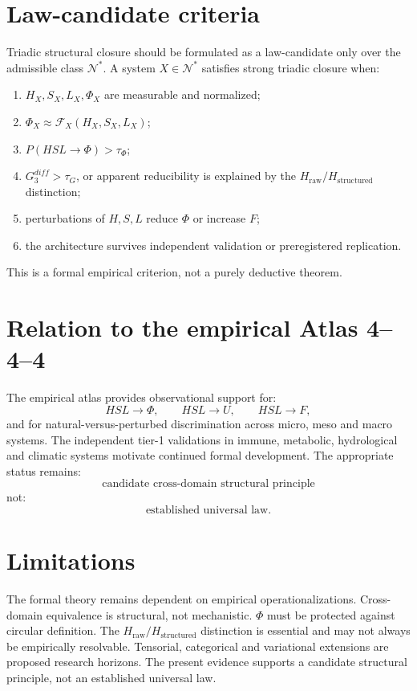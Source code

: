 \documentclass[11pt,a4paper]{article}
\newcommand{\Hraw}{H_{\mathrm{raw}}}
\newcommand{\Hstr}{H_{\mathrm{structured}}}
\newcommand{\Nstar}{\mathcal{N}^{*}}
\begin{document}
\section{Law-candidate criteria}

Triadic structural closure should be formulated as a law-candidate only over the admissible class $\Nstar$.
A system $X\in\Nstar$ satisfies strong triadic closure when:
\begin{enumerate}
\item $H_X,S_X,L_X,\Phi_X$ are measurable and normalized;
\item $\Phi_X\approx\mathcal{F}_X(H_X,S_X,L_X)$;
\item $P(HSL\rightarrow\Phi)>\tau_\Phi$;
\item $G_3^{diff}>\tau_G$, or apparent reducibility is explained by the $\Hraw/\Hstr$ distinction;
\item perturbations of $H,S,L$ reduce $\Phi$ or increase $F$;
\item the architecture survives independent validation or preregistered replication.
\end{enumerate}
This is a formal empirical criterion, not a purely deductive theorem.

\section{Relation to the empirical Atlas 4--4--4}

The empirical atlas provides observational support for:
\[
HSL\rightarrow\Phi,\qquad HSL\rightarrow U,\qquad HSL\rightarrow F,
\]
and for natural-versus-perturbed discrimination across micro, meso and macro systems.
The independent tier-1 validations in immune, metabolic, hydrological and climatic systems motivate continued formal development.
The appropriate status remains:
\[
\boxed{
\text{candidate cross-domain structural principle}
}
\]
not:
\[
\boxed{
\text{established universal law}.
}
\]

\section{Limitations}

The formal theory remains dependent on empirical operationalizations.
Cross-domain equivalence is structural, not mechanistic.
$\Phi$ must be protected against circular definition.
The $\Hraw/\Hstr$ distinction is essential and may not always be empirically resolvable.
Tensorial, categorical and variational extensions are proposed research horizons.
The present evidence supports a candidate structural principle, not an established universal law.
\end{document}
